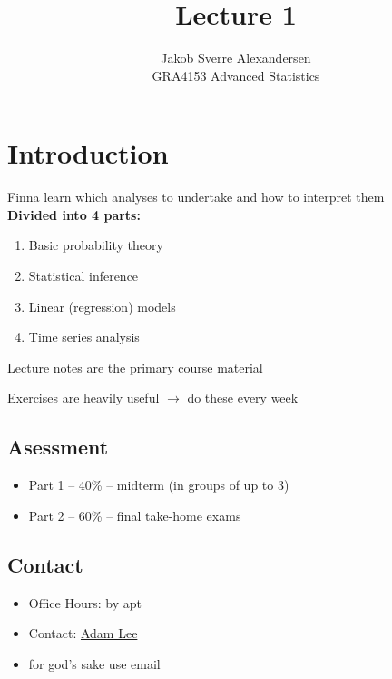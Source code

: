 \documentclass[10pt]{article}
\begin{document}
 
\title{Lecture 1}
\author{Jakob Sverre Alexandersen\\
GRA4153 Advanced Statistics}
\maketitle

\tableofcontents
\newpage
 
\section{Introduction}

Finna learn which analyses to undertake and how to interpret them\\

\textbf{Divided into 4 parts:}

\begin{enumerate}
    \item Basic probability theory
    \item Statistical inference
    \item Linear (regression) models
    \item Time series analysis
\end{enumerate}

Lecture notes are the primary course material

Exercises are heavily useful $\to$ do these every week

\subsection{Asessment}

\begin{itemize}
    \item Part 1 – 40\% – midterm (in groups of up to 3)
    \item Part 2 – 60\% – final take-home exams
\end{itemize}

\subsection{Contact}
\begin{itemize}
    \item Office Hours: by apt
    \item Contact: \href{mailto:adam.lee@bi.no}{Adam Lee}
    \item for god's sake use email
\end{itemize}
\end{document}
